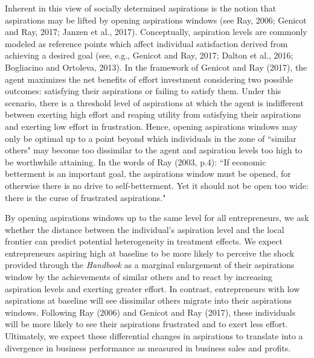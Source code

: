 \documentclass[11.5pt]{article}
\begin{document}
Inherent in this view of socially determined aspirations is the notion that aspirations may be lifted by opening aspirations windows (see Ray, 2006; Genicot and Ray, 2017; Janzen et al., 2017). Conceptually, aspiration levels are commonly modeled as reference points which affect individual satisfaction derived from achieving a desired goal (see, e.g., Genicot and Ray, 2017; Dalton et al., 2016; Bogliacino and Ortoleva, 2013). In the framework of Genicot and Ray (2017), the agent maximizes the net benefits of effort investment considering two possible outcomes: satisfying their aspirations or failing to satisfy them. Under this scenario, there is a threshold level of aspirations at which the agent is indifferent between exerting high effort and reaping utility from satisfying their aspirations and exerting low effort in frustration. Hence, opening aspirations windows may only be optimal up to a point beyond which individuals in the zone of ``similar others" may become too dissimilar to the agent and aspiration levels too high to be worthwhile attaining. In the words of Ray (2003, p.4): ``If economic betterment is an important goal, the aspirations window must be opened, for otherwise there is no drive to self-betterment. Yet it should not be open too wide: there is the curse of frustrated aspirations."

By opening aspirations windows up to the same level for all entrepreneurs, we ask whether the distance between the individual's aspiration level and the local frontier can predict potential heterogeneity in treatment effects. We expect entrepreneurs aspiring high at baseline to be more likely to perceive the shock provided through the \emph{Handbook} as a marginal enlargement of their aspirations window by the achievements of similar others and to react by increasing aspiration levels and exerting greater effort. In contrast, entrepreneurs with low aspirations at baseline will see dissimilar others migrate into their aspirations windows. Following Ray (2006) and Genicot and Ray (2017), these individuals will be more likely to see their aspirations frustrated and to exert less effort. Ultimately, we expect these differential changes in aspirations to translate into a divergence in business performance as measured in business sales and profits. 
\end{document}

